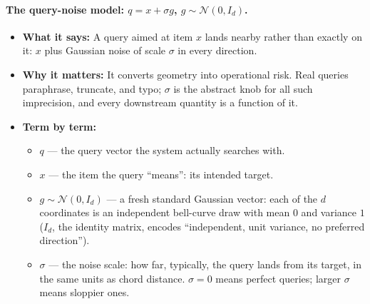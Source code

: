 \documentclass[11pt,letterpaper]{article}
\begin{document}
\paragraph{The query-noise model: $q = x + \sigma g$, $g \sim \mathcal N(0,
I_d)$.}
\begin{itemize}
  \item \textbf{What it says:} A query aimed at item $x$ lands nearby
  rather than exactly on it: $x$ plus Gaussian noise of scale $\sigma$ in
  every direction.
  \item \textbf{Why it matters:} It converts geometry into operational
  risk. Real queries paraphrase, truncate, and typo; $\sigma$ is the
  abstract knob for all such imprecision, and every downstream quantity is
  a function of it.
  \item \textbf{Term by term:}
  \begin{itemize}
    \item $q$ --- the query vector the system actually searches with.
    \item $x$ --- the item the query ``means'': its intended target.
    \item $g \sim \mathcal N(0, I_d)$ --- a fresh standard Gaussian vector:
    each of the $d$ coordinates is an independent bell-curve draw with mean
    $0$ and variance $1$ ($I_d$, the identity matrix, encodes
    ``independent, unit variance, no preferred direction'').
    \item $\sigma$ --- the noise scale: how far, typically, the query lands
    from its target, in the same units as chord distance. $\sigma = 0$
    means perfect queries; larger $\sigma$ means sloppier ones.
  \end{itemize}
\end{itemize}
\end{document}
